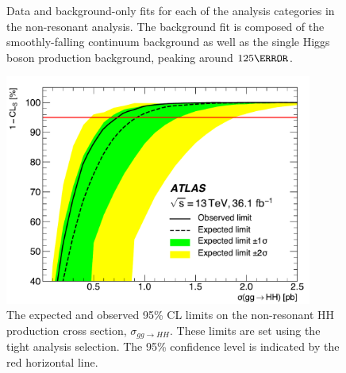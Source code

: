 \begin{figure}[htbp]
	\quad
	\caption{Data and background-only fits for each of the analysis categories in the non-resonant analysis. The background fit is composed of the smoothly-falling continuum \yy background as well as the single Higgs boson production background, peaking around $\unit{125}{\GeV}$.}
  \label{fig:results-myy}
\end{figure}


\begin{figure}[htbp]
  \centering
\includegraphics[width=0.9\textwidth]{chapters/chapter5_yybb/images/limits/nonresonant.pdf}
  \caption[The expected and observed limits on the non-resonant HH production cross section]
  {The expected and observed 95\% \gls{CL} limits on the non-resonant HH production cross section, $\sigma_{gg\rightarrow HH}$. These limits are set using the tight analysis selection. The 95\% confidence level is indicated by the red horizontal line.}
  \label{fig:limits-nonresonant}
\end{figure}

